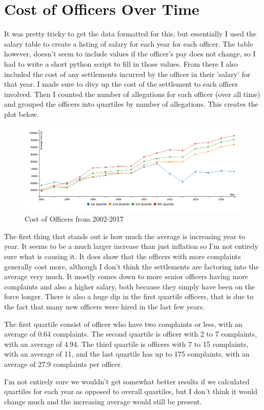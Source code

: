 \documentclass[11pt]{article}
\begin{document}
\section{Cost of Officers Over Time}
It was pretty tricky to get the data formatted for this, but essentially I used the salary table to create a listing of salary for each year for each officer. The table however, doesn't seem to include values if the officer's pay does not change, so I had to write a short python script to fill in those values. From there I also included the cost of any settlements incurred by the officer in their 'salary' for that year. I made sure to divy up the cost of the settlement to each officer involved. Then I counted the number of allegations for each officer (over all time) and grouped the officers into quartiles by number of allegations. This creates the plot below.

\begin{figure}[h]
\caption{Cost of Officers from 2002-2017}
\includegraphics[width=\textwidth]{costline.png}
\end{figure}

The first thing that stands out is how much the average is increasing year to year. It seems to be a much larger increase than just inflation so I'm not entirely sure what is causing it. It does show that the officers with more complaints generally cost more, although I don't think the settlements are factoring into the average very much. It mostly comes down to more senior officers having more complaints and also a higher salary, both because they simply have been on the force longer. There is also a huge dip in the first quartile officers, that is due to the fact that many new officers were hired in the last few years.

The first quartile consist of officer who have two complaints or less, with an average of 0.64 complaints. The second quartile is officer with 2 to 7 complaints, with an average of 4.94. The third quartile is officers with 7 to 15 complaints, with an average of 11, and the last quartile has up to 175 complaints, with an average of 27.9 complaints per officer.

I'm not entirely sure we wouldn't get somewhat better results if we calculated quartiles for each year as opposed to overall quartiles, but I don't think it would change much and the increasing average would still be present.
\end{document}
